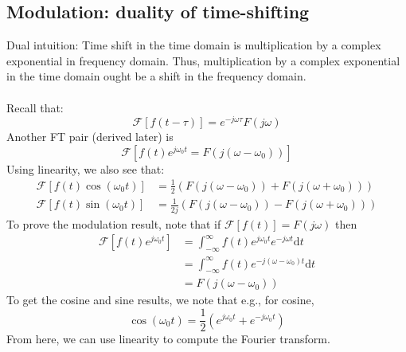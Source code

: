 \documentclass[10pt]{article}
\begin{document}
\subsection*{Modulation: duality of time-shifting}
Dual intuition: Time shift in the time domain is multiplication by a complex exponential in frequency domain.  Thus, multiplication by a complex exponential in the time domain ought be a shift in the frequency domain.\\\\
Recall that:
\[\boxed{\mathcal{F}[f(t-\tau)] = e^{-j\omega \tau} F(j\omega)}\]
Another FT pair (derived later) is
\[\mathcal{F}[f(t)e^{j\omega_0 t} = F(j(\omega - \omega_0))]\]
Using linearity, we also see that:
\begin{align*}
    \mathcal{F}[f(t)\cos(\omega_0 t)] &= \frac{1}{2}(F(j(\omega - \omega_0)) + F(j(\omega + \omega_0)))\\
    \mathcal{F}[f(t)\sin(\omega_0 t)] &= \frac{1}{2j}(F(j(\omega - \omega_0)) - F(j(\omega + \omega_0)))
\end{align*}
To prove the modulation result, note that if $\mathcal{F}[f(t)] = F(j\omega)$ then
\begin{align*}
    \mathcal{F}[f(t)e^{j\omega_0 t}] &= \int_{-\infty}^\infty f(t)e^{j\omega_0 t} e^{-j\omega t} \text{d}t\\
    &= \int_{-\infty}^\infty f(t) e^{-j(\omega-\omega_0)t} \text{d}t\\
    &= F(j(\omega-\omega_0))
\end{align*}
To get the cosine and sine results, we note that e.g., for cosine,
\[\cos(\omega_0 t) = \frac{1}{2}\left(e^{j\omega_0 t} + e^{-j\omega_0 t}\right)\]
From here, we can use linearity to compute the Fourier transform.
\end{document}
